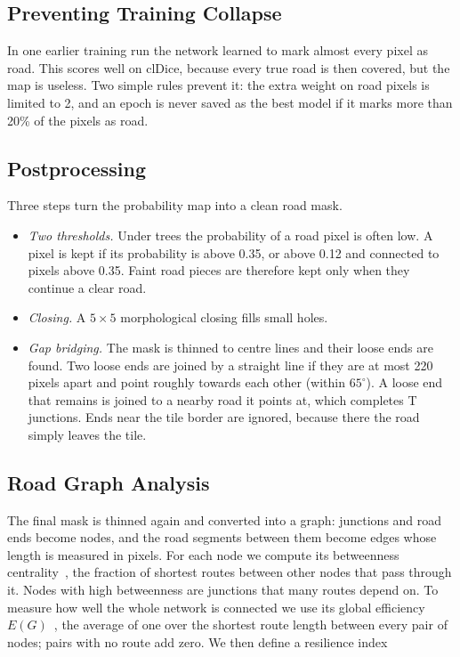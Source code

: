 \documentclass{ieeeaccess}
\begin{document}
\subsection{Preventing Training Collapse}

In one earlier training run the network learned to mark almost every pixel as road. This scores well on clDice, because every true road is then covered, but the map is useless. Two simple rules prevent it: the extra weight on road pixels is limited to 2, and an epoch is never saved as the best model if it marks more than 20\% of the pixels as road.

\subsection{Postprocessing}

Three steps turn the probability map into a clean road mask.

\begin{itemize}

\item \emph{Two thresholds.} Under trees the probability of a road pixel is often low. A pixel is kept if its probability is above 0.35, or above 0.12 and connected to pixels above 0.35. Faint road pieces are therefore kept only when they continue a clear road.

\item \emph{Closing.} A $5 \times 5$ morphological closing fills small holes.

\item \emph{Gap bridging.} The mask is thinned to centre lines and their loose ends are found. Two loose ends are joined by a straight line if they are at most 220 pixels apart and point roughly towards each other (within $65^{\circ}$). A loose end that remains is joined to a nearby road it points at, which completes T junctions. Ends near the tile border are ignored, because there the road simply leaves the tile.

\end{itemize}

\subsection{Road Graph Analysis}

The final mask is thinned again and converted into a graph: junctions and road ends become nodes, and the road segments between them become edges whose length is measured in pixels. For each node we compute its betweenness centrality~\cite{freeman1977betweenness}, the fraction of shortest routes between other nodes that pass through it. Nodes with high betweenness are junctions that many routes depend on. To measure how well the whole network is connected we use its global efficiency $E(G)$~\cite{latora2001efficient}, the average of one over the shortest route length between every pair of nodes; pairs with no route add zero. We then define a resilience index
\end{document}
